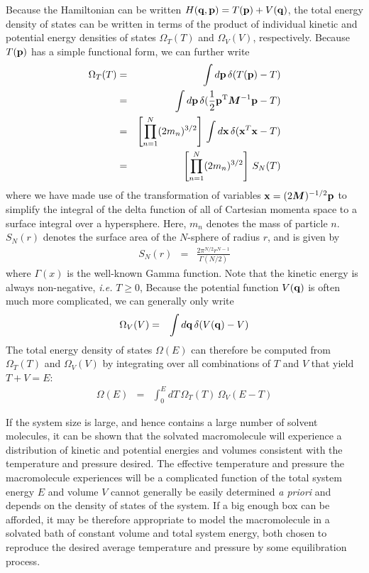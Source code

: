 
Because the Hamiltonian can be written $H({\bf q},{\bf p}) = T({\bf p}) + V({\bf q})$, the total energy density of states can be written in terms of the product of individual kinetic and potential energy densities of states $\Omega_T(T)$ and $\Omega_V(V)$, respectively.
Because $T({\bf p})$ has a simple functional form, we can further write
\begin{eqnarray}
\Omega_T(T) &=& \int d{\bf p} \, \delta( T({\bf p} )- T ) \nonumber \\
&=& \int d{\bf p} \, \delta(\frac{1}{2} {\bf p}^{\mathrm{T}} {\mbox{\boldmath{$M$}}}^{-1} {\bf p} - T) \nonumber \\
&=& \left[ \prod_{n=1}^N (2 m_n)^{3/2} \right] \, \int d{\bf x} \, \delta({\bf x}^T {\bf x} - T) \nonumber \\
&=& \left[ \prod_{n=1}^N (2 m_n)^{3/2} \right] \, S_N(T)
\end{eqnarray}
where we have made use of the transformation of variables ${\bf x} = (2 {\mbox{\boldmath{$M$}}})^{-1/2} {\bf p}$ to simplify the integral of the delta function of all of Cartesian momenta space to a surface integral over a hypersphere.
Here, $m_n$ denotes the mass of particle $n$.
$S_N(r)$ denotes the surface area of the $N$-sphere of radius $r$, and is given by
\begin{eqnarray}
S_N(r) &=& \frac{2 \pi^{N/2} r^{N-1}}{\Gamma(N/2)}
\end{eqnarray}
where $\Gamma(x)$ is the well-known Gamma function.  
Note that the kinetic energy is always non-negative, \emph{i.e.} $T \ge 0$,
Because the potential function $V({\bf q})$ is often much more complicated, we can generally only write
\begin{eqnarray}
\Omega_V(V) &=& \int d{\bf q} \, \delta( V({\bf q}) - V )
\end{eqnarray}
The total energy density of states $\Omega(E)$ can therefore be computed from $\Omega_T(T)$ and $\Omega_V(V)$ by integrating over all combinations of $T$ and $V$ that yield $T + V = E$:
\begin{eqnarray}
\Omega(E) &=& \int_0^E dT \, \Omega_T(T) \, \Omega_V(E - T)
\end{eqnarray}

If the system size is large, and hence contains a large number of solvent molecules, it can be shown that the solvated macromolecule will experience a distribution of kinetic and potential energies and volumes consistent with the temperature and pressure desired.  %
The effective temperature and pressure the macromolecule experiences will be a complicated function of the total system energy $E$ and volume $V$ cannot generally be easily determined \emph{a priori} and depends on the density of states of the system.
If a big enough box can be afforded, it may be therefore appropriate to model the macromolecule in a solvated bath of constant volume and total system energy, both chosen to reproduce the desired average temperature and pressure by some equilibration process.

